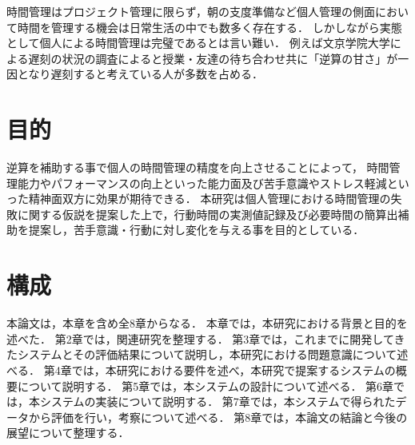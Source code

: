 時間管理はプロジェクト管理に限らず，朝の支度準備など個人管理の側面において時間を管理する機会は日常生活の中でも数多く存在する．
しかしながら実態として個人による時間管理は完璧であるとは言い難い．
例えば文京学院大学による遅刻の状況の調査によると授業・友達の待ち合わせ共に「逆算の甘さ」が一因となり遅刻すると考えている人が多数を占める\cite{bunkyo}．

\section{目的}
逆算を補助する事で個人の時間管理の精度を向上させることによって，
時間管理能力やパフォーマンスの向上といった能力面及び苦手意識やストレス軽減といった精神面双方に効果が期待できる．
本研究は個人管理における時間管理の失敗に関する仮説を提案した上で，行動時間の実測値記録及び必要時間の簡算出補助を提案し，苦手意識・行動に対し変化を与える事を目的としている．

\section{構成}
本論文は，本章を含め全8章からなる．
本章では，本研究における背景と目的を述べた．
第2章では，関連研究を整理する．
第3章では，これまでに開発してきたシステムとその評価結果について説明し，本研究における問題意識について述べる．
第4章では，本研究における要件を述べ，本研究で提案するシステムの概要について説明する．
第5章では，本システムの設計について述べる．
第6章では，本システムの実装について説明する．
第7章では，本システムで得られたデータから評価を行い，考察について述べる．
第8章では，本論文の結論と今後の展望について整理する．